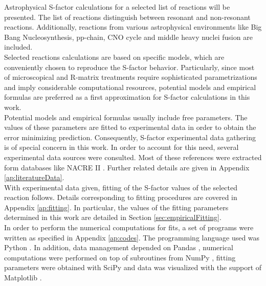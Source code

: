 \documentclass[openany]{book}
\begin{document}
Astrophysical S-factor calculations for a selected list of reactions will be presented. The list of reactions distinguish between resonant and non-resonant reactions. Additionally, reactions from various astrophysical environments like Big Bang Nucleosynthesis, pp-chain, CNO cycle and middle heavy nuclei fusion are included.  \\

Selected reactions calculations are based on specific models, which are conveniently chosen to reproduce the S-factor behavior. Particularly, since most of microscopical and R-matrix treatments require sophisticated parametrizations and imply considerable computational resources, potential models and empirical formulas are preferred as a first approximation for S-factor calculations in this work.  \\

Potential models and empirical formulas usually include free parameters. The values of these parameters are fitted to experimental data in order to obtain the error minimizing prediction. Consequently, S-factor experimental data gathering is of special concern in this work. In order to account for this need, several experimental data sources were consulted. Most of these references were extracted form databases like NACRE II \cite{xu_takahashi_goriely_arnould_ohta_utsunomiya_2013}. Further related details are given in Appendix \ref{ap:literatureData}. \\ 

With experimental data given, fitting of the S-factor values of the selected reaction follows. Details corresponding to fitting procedures are covered in Appendix \ref{ap:fitting}.  In particular, the values of the fitting parameters determined in this work are detailed in Section \ref{sec:empiricalFitting}.  \\

In order to perform the numerical computations for fits, a set of programs were written as specified in Appendix \ref{ap:codes}. The programming language used was Python \cite{rossum_drake_2009}. In addition, data management depended on Pandas \cite{mckinney_2010}, numerical computations were performed on top of subroutines from NumPy  \cite{harris_millman_vanderwalt_gommers_virtanen_cournapeau_wieser_taylor_berg_smith_et_2020}, fitting parameters were obtained with SciPy \cite{virtanen_gommers_oliphant_haberland_reddy_cournapeau_burovski_peterson_weckesser_bright_et_2020} and data was visualized with the support of Matplotlib \cite{hunter_2007}. \\
\end{document}
